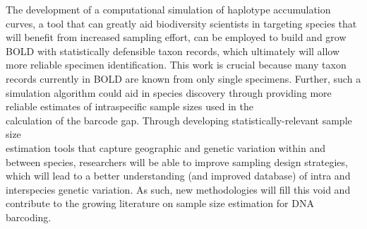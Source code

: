 The development of a computational simulation of haplotype accumulation curves, a tool that can greatly aid biodiversity scientists in targeting species that will benefit from increased sampling effort, can be employed to build and grow BOLD with statistically defensible taxon records, which ultimately will allow more reliable specimen identification. This work is crucial because many taxon records currently in BOLD are known from only single specimens. Further, such a simulation algorithm could aid in species discovery through providing more reliable estimates of intraspecific sample sizes used in the \\ calculation of the barcode gap. Through developing statistically-relevant sample size \\ estimation tools that capture geographic and genetic variation within and between species, researchers will be able to improve sampling design strategies, which will lead to a better understanding (and improved database) of intra and interspecies genetic variation. As such, new methodologies will fill this void and contribute to the growing literature on sample size estimation for DNA barcoding.



